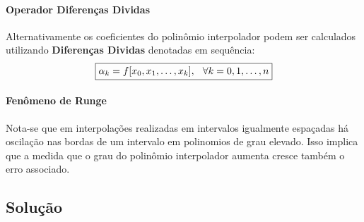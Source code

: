 \documentclass{article}
\begin{document}
        \paragraph{Operador Diferenças Dividas}Alternativamente os coeficientes do polinômio interpolador podem ser calculados utilizando \textbf{Diferenças Dividas} denotadas em sequência:
            \[\boxed{\alpha_{k} = f[x_{0}, x_{1}, \dots, x_{k}], \hspace{2.5mm} \forall k = 0, 1, \dots, n}\]

        \paragraph{Fenômeno de Runge}Nota-se que em interpolações realizadas em intervalos igualmente espaçadas há oscilação nas bordas de um intervalo em polinomios de grau elevado. Isso implica que a medida que o grau do polinômio interpolador aumenta cresce também o erro associado.

        \subsection{Solução}
\end{document}
